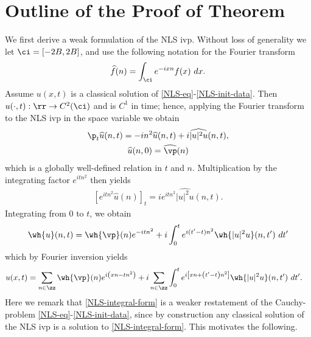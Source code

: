 \section{Outline of the Proof of Theorem}
%
%
%
%
%
We first derive a weak formulation of the NLS ivp. Without loss of 
generality we let $\ci = [-2B, 2B]$, and use
the following notation for the Fourier transform
%
%
%
%
\begin{equation*}
	\begin{split}
		\widehat{f}(n) = \int_{\ci} e^{-ix n} f(x) \ dx.
	\end{split}
\end{equation*}
Assume 
$u(x,t)$ is a classical solution of \eqref{NLS-eq}-\eqref{NLS-init-data}.
Then $u(\cdot ,   t): \rr \to C^2(\ci)$ and is $C^1$ in time; hence, applying 
the Fourier transform to the NLS ivp in the space variable we obtain 
%
%
\begin{gather*}
	\p_t \widehat{u}(n, t) = -i n^2 \widehat{u}(n, t) + i  
	\widehat{|u|^{2} u} (n, t),
	\\
	\widehat{u} (n,0) = \widehat{\vp}(n)
\end{gather*}
%
%
which is a globally well-defined relation in $t$ 
and $n$. Multiplication by the integrating factor $e^{itn^2}$ then yields
\begin{equation*}
	\begin{split}
		\left[ e^{it n^2} \widehat{u}(n) \right]_t = i
		 e^{it n^2} \widehat{|u|^{2} u} (n, t).	
	\end{split}
\end{equation*}
%
%
Integrating from $0$ to $t$, we obtain
%
%
\begin{equation*}
	\begin{split}
		\wh{u}(n, t) = \wh{\vp}(n) e^{-it n^2} + i  
		\int_0^t e^{i(t' - t)n^2} \wh{|u|^{2} u}(n, t') \ 
		dt'
	\end{split}
\end{equation*}
%
%
which by Fourier inversion yields 
%
%
\begin{equation}
	\label{NLS-integral-form}
	\begin{split}
		u(x,t) & = \sum_{n \in \zz} \wh{\vp}(n) e^{i\left( xn - t n^2 
		\right)} 
		 + i \sum_{n \in \zz} \int_0^t e^{i\left[ xn + \left( t' - t 
		\right)n^2 \right]} \wh{|u|^2 u}(n, t') \ dt'.
	\end{split}
\end{equation}
%
%
Here we remark that \eqref{NLS-integral-form} is a weaker 
restatement of the Cauchy-problem \eqref{NLS-eq}-\eqref{NLS-init-data}, 
since by construction any classical solution of the NLS ivp is a solution to 
\eqref{NLS-integral-form}. This motivates the following.



